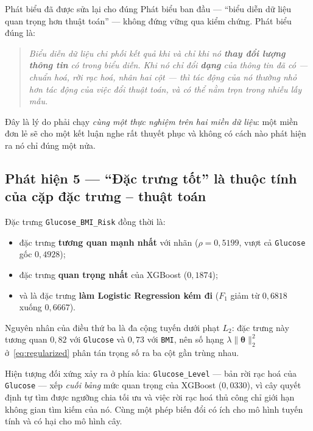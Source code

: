 \begin{phathien}{Phát biểu đã được sửa lại cho đúng}
Phát biểu ban đầu --- ``biểu diễn dữ liệu quan trọng hơn thuật toán'' --- không
đứng vững qua kiểm chứng. Phát biểu đúng là:

\begin{quote}
\itshape
Biểu diễn dữ liệu chi phối kết quả khi và chỉ khi nó \textbf{thay đổi lượng
thông tin} có trong biểu diễn. Khi nó chỉ đổi \textbf{dạng} của thông tin đã có
--- chuẩn hoá, rời rạc hoá, nhân hai cột --- thì tác động của nó thường nhỏ hơn
tác động của việc đổi thuật toán, và có thể nằm trọn trong nhiễu lấy mẫu.
\end{quote}

Đây là lý do phải chạy \emph{cùng một thực nghiệm trên hai miền dữ liệu}: một
miền đơn lẻ sẽ cho một kết luận nghe rất thuyết phục và không có cách nào phát
hiện ra nó chỉ đúng một nửa.
\end{phathien}

\subsection{Phát hiện 5 --- ``Đặc trưng tốt'' là thuộc tính của cặp đặc trưng -- thuật toán}

Đặc trưng \texttt{Glucose\_BMI\_Risk} đồng thời là:

\begin{itemize}
  \item đặc trưng \textbf{tương quan mạnh nhất} với nhãn ($\rho = 0{,}5199$,
        vượt cả \texttt{Glucose} gốc $0{,}4928$);
  \item đặc trưng \textbf{quan trọng nhất} của XGBoost ($0{,}1874$);
  \item và là đặc trưng \textbf{làm Logistic Regression kém đi}
        ($F_1$ giảm từ $0{,}6818$ xuống $0{,}6667$).
\end{itemize}

Nguyên nhân của điều thứ ba là đa cộng tuyến dưới phạt $L_2$: đặc trưng này
tương quan $0{,}82$ với \texttt{Glucose} và $0{,}73$ với \texttt{BMI}, nên số
hạng $\lambda\lVert\bm\theta\rVert_2^2$ ở~\eqref{eq:regularized} phân tán trọng
số ra ba cột gần trùng nhau.

Hiện tượng đối xứng xảy ra ở phía kia: \texttt{Glucose\_Level} --- bản rời rạc
hoá của \texttt{Glucose} --- xếp \emph{cuối bảng} mức quan trọng của XGBoost
($0{,}0330$), vì cây quyết định tự tìm được ngưỡng chia tối ưu và việc rời rạc
hoá thủ công chỉ giới hạn không gian tìm kiếm của nó. Cùng một phép biến đổi có
ích cho mô hình tuyến tính và có hại cho mô hình cây.

